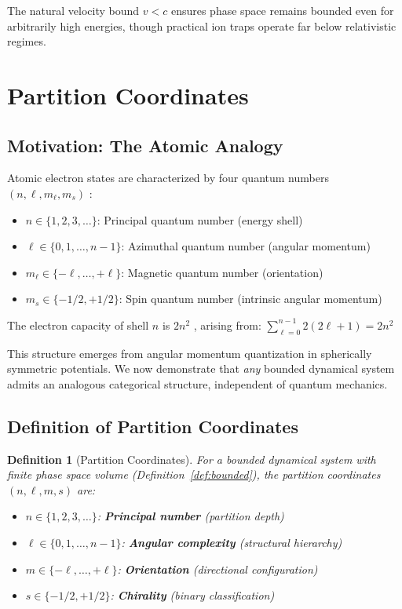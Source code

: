 \documentclass[twocolumn,10pt]{article}
\newtheorem{definition}[theorem]{Definition}
\begin{document}
The natural velocity bound $v < c$ ensures phase space remains bounded even for arbitrarily high energies, though practical ion traps operate far below relativistic regimes.

\section{Partition Coordinates}
\label{sec:coordinates}

\subsection{Motivation: The Atomic Analogy}

Atomic electron states are characterized by four quantum numbers $(n, \ell, m_\ell, m_s)$ \citep{dirac1981principles,sakurai2017modern}:
\begin{itemize}
    \item $n \in \{1, 2, 3, \ldots\}$: Principal quantum number (energy shell)
    \item $\ell \in \{0, 1, \ldots, n-1\}$: Azimuthal quantum number (angular momentum)
    \item $m_\ell \in \{-\ell, \ldots, +\ell\}$: Magnetic quantum number (orientation)
    \item $m_s \in \{-1/2, +1/2\}$: Spin quantum number (intrinsic angular momentum)
\end{itemize}

The electron capacity of shell $n$ is $2n^2$ \citep{pauli1925zusammenhang}, arising from:
$
\sum_{\ell=0}^{n-1} 2(2\ell + 1) = 2n^2
$

This structure emerges from angular momentum quantization in spherically symmetric potentials. We now demonstrate that \emph{any} bounded dynamical system admits an analogous categorical structure, independent of quantum mechanics.

\subsection{Definition of Partition Coordinates}

\begin{definition}[Partition Coordinates]
\label{def:partition}
For a bounded dynamical system with finite phase space volume (Definition~\ref{def:bounded}), the \emph{partition coordinates} $(n, \ell, m, s)$ are:
\begin{itemize}
    \item $n \in \{1, 2, 3, \ldots\}$: \textbf{Principal number} (partition depth)
    \item $\ell \in \{0, 1, \ldots, n-1\}$: \textbf{Angular complexity} (structural hierarchy)
    \item $m \in \{-\ell, \ldots, +\ell\}$: \textbf{Orientation} (directional configuration)
    \item $s \in \{-1/2, +1/2\}$: \textbf{Chirality} (binary classification)
\end{itemize}
\end{definition}
\end{document}
